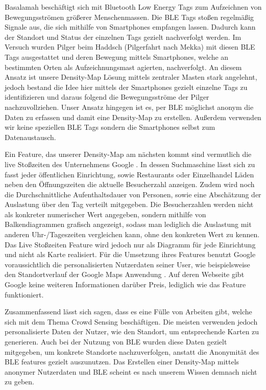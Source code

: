 \documentclass[conference]{IEEEtran}
\begin{document}
Basalamah \cite{BLETags} beschäftigt sich mit Bluetooth Low Energy Tags zum Aufzeichnen von Bewegungsströmen größerer Menschenmassen. 
Die BLE Tags stoßen regelmäßig Signale aus, die sich mithilfe von Smartphones empfangen lassen. 
Dadurch kann der Standort und Status der einzelnen Tags gezielt nachverfolgt werden. 
Im Versuch wurden Pilger beim Haddsch (Pilgerfahrt nach Mekka) mit diesen BLE Tags ausgestattet und deren Bewegung mittels Smartphones, welche an bestimmten Orten als Aufzeichnungsmast agierten, nachverfolgt. 
An diesem Ansatz ist unsere Density-Map Lösung mittels zentraler Masten stark angelehnt, jedoch bestand die Idee hier mittels der Smartphones gezielt einzelne Tags zu identifizieren und daraus folgend die Bewegungsströme der Pilger nachzuvollziehen. 
Unser Ansatz hingegen ist es, per BLE möglichst anonym die Daten zu erfassen und damit eine Density-Map zu erstellen. 
Außerdem verwenden wir keine speziellen BLE Tags sondern die Smartphones selbst zum Datenaustausch. 

Ein Feature, das unserer Density-Map am nächsten kommt sind vermutlich die live Stoßzeiten des Unternehmens Google \cite{GoogleStosszeiten}.  
In dessen Suchmaschine lässt sich zu fasst jeder öffentlichen Einrichtung, sowie Restaurants oder Einzelhandel Läden neben den Öffnungszeiten die aktuelle Besucherzahl anzeigen. 
Zudem wird noch die Durchschnittliche Aufenthaltsdauer von Personen, sowie eine Abschätzung der Auslastung über den Tag verteilt mitgegeben. 
Die Besucherzahlen werden nicht als konkreter numerischer Wert angegeben, sondern mithilfe von Balkendiagrammen grafisch angezeigt, sodass man lediglich die Auslastung mit anderen Uhr-/Tageszeiten vergleichen kann, ohne den konkreten Wert zu kennen. 
Das Live Stoßzeiten Feature wird jedoch nur als Diagramm für jede Einrichtung und nicht als Karte realisiert.
Für die Umsetzung ihres Features benutzt Google voraussichtlich die personalisierten Nutzerdaten seiner User, wie beispielsweise den Standortverlauf der Google Maps Anwendung \cite{GoogleStandortverlauf}. 
Auf deren Webseite gibt Google keine weiteren Informationen darüber Preis, lediglich wie das Feature funktioniert. 

Zusammenfassend lässt sich sagen, dass es eine Fülle von Arbeiten gibt, welche sich mit dem Thema Crowd Sensing beschäftigen. 
Die meisten verwenden jedoch personalisierte Daten der Nutzer, wie den Standort, um entsprechende Karten zu generieren. 
Auch bei der Nutzung von BLE wurden diese Daten gezielt mitgegeben, um konkrete Standorte nachzuverfolgen, anstatt die Anonymität des BLE features gezielt auszunutzen. 
Das Erstellen einer Density-Map mittels anonymer Nutzerdaten und BLE scheint es nach unserem Wissen demnach nicht zu geben. 
\end{document}
